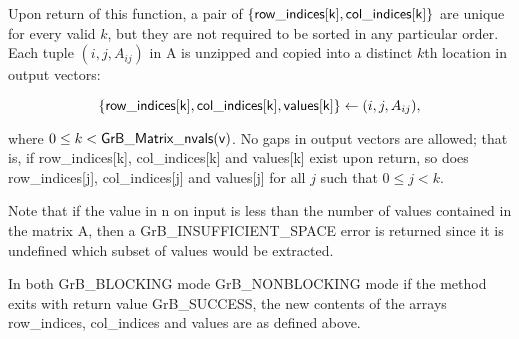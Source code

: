 Upon return of this function, a pair of $\{{\sf row\_indices[k], col\_indices[k]}\}$ are unique for every valid $k$, 
but they are not required to be sorted in any particular order.
Each tuple $(i,j,A_{ij})$ in {\sf A} is unzipped and copied into a distinct $k$th location in output vectors:  

$$\{{\sf row\_indices[k]}, {\sf col\_indices[k]}, {\sf values[k]}\} \leftarrow (i,j,A_{ij}),$$

where $0 \leq k < {\sf GrB\_Matrix\_nvals(v)}$. 
No gaps in output vectors are allowed; that is, if {\sf row\_indices[k]},  {\sf col\_indices[k]}  and {\sf values[k]} exist upon return, 
so does {\sf row\_indices[j]}, {\sf col\_indices[j]} and {\sf values[j]} for all $j$ such that $0 \leq j < k$.

Note that if the value in {\sf n} on input is less than the number of values
contained in the matrix {\sf A}, then a {\sf GrB\_INSUFFICIENT\_SPACE} error 
is returned since it is undefined which subset of values would
be extracted.

In both {\sf GrB\_BLOCKING} mode {\sf GrB\_NONBLOCKING} mode
if the method exits with return value {\sf GrB\_SUCCESS}, the  new 
contents of the arrays {\sf row\_indices}, {\sf col\_indices} and {\sf values} are as defined above.  


